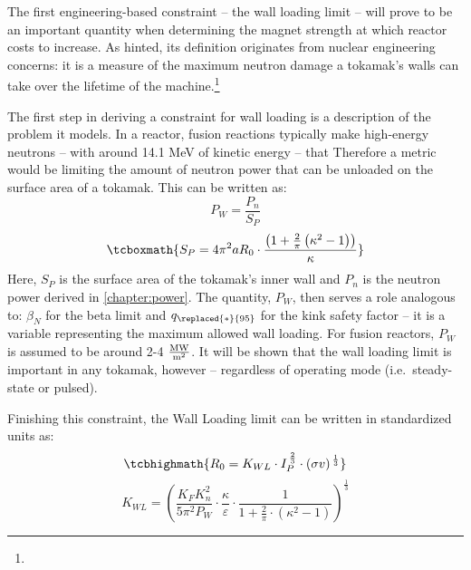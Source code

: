 \label{subsection:wall_loading}

The first engineering-based  constraint -- the wall loading limit -- will prove to be an important quantity when determining the magnet strength at which reactor costs  to increase. As hinted, its definition originates from nuclear engineering concerns: it is a measure of the maximum neutron damage a tokamak's walls can take over the lifetime of the machine.\footnote{}

The first step in deriving a  constraint for wall loading is a description of the problem it models. In a reactor, fusion reactions typically make high-energy neutrons -- with around 14.1 MeV of kinetic energy -- that  Therefore a  metric would be limiting the amount of neutron power that can be unloaded on the surface area of a tokamak. This can be written as:\cite{minervini}
\begin{equation}
	P_W = \frac{ P_n }{ S_P }
\end{equation}
\begin{equation}
	\tcboxmath{
	S_P = 4 \pi^2 a R_0 \cdot \frac{ \left( 1 + \frac{2}{\pi} \left( \kappa^2 -1 \right) \right) }{ \kappa }
	}
\end{equation}
Here, $S_P$ is the surface area of the tokamak's inner wall and $P_n$ is the neutron power derived in \cref{chapter:power}. The quantity, $P_W$, then serves a role analogous to: $\beta_N$ for the beta limit and $q_{\replaced{*}{95}}$ for the kink safety factor -- it is a  variable representing the maximum allowed wall loading. For fusion reactors, $P_W$ is assumed to be around 2-4 $\frac{\textnormal{MW}}{\textnormal{m}^2}$. It will be shown that the wall loading limit is important in any tokamak, however -- regardless of operating mode (i.e.\ steady-state or pulsed).

Finishing this  constraint, the Wall Loading limit can be written in standardized units as:
\begin{equation}
	\label{eq:r_wall}
	\tcbhighmath{ R_0 = K_{WL} \cdot I_P^{ \, \frac{2}{3} } \cdot (\sigma v) ^{ \, \frac{1}{3} } }
\end{equation}
\begin{equation}
	K_{WL} = \left( \frac{ K_F K_n^2 }{ 5 \pi^2 P_W } \cdot \frac{\kappa}{\varepsilon} \cdot \frac{1}{1 + \frac{2}{\pi} \cdot ( \kappa^2 - 1 ) } \right) ^ { \frac{1}{3} }
\end{equation}
